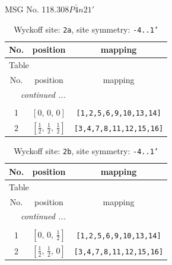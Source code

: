 \documentclass[fleqn,8pt]{jsarticle}
\begin{document}
\setcounter{MaxMatrixCols}{32}

\renewcommand{\tablename}{Table~}
\renewcommand{\figurename}{Figure~}
\begin{center}
\LARGE
MSG No. 118.308\quad$P\bar{4}n21'$
\end{center}
\renewcommand{\arraystretch}{1.2}
\begin{longtable}{ccc}
\caption{Wyckoff site: {\tt 2a}, site symmetry: {\tt -4..1'}}
 \\
 \hline \hline
No. & position & mapping \\ \hline \endfirsthead

\multicolumn{2}{l}{\tablename\ \thetable{}} \\
 \hline \hline
No. & position & mapping \\ \hline \endhead

 \hline \hline
\multicolumn{2}{r}{\footnotesize\it continued ...} \\ \endfoot

 \hline \hline
\multicolumn{2}{r}{} \\ \endlastfoot

1 & $\left[ 0,\, 0,\, 0 \right]$ & {\tt [1,2,5,6,9,10,13,14]} \\ \hline
2 & $\left[ \frac{1}{2},\, \frac{1}{2},\, \frac{1}{2} \right]$ & {\tt [3,4,7,8,11,12,15,16]} \\
\end{longtable}
\renewcommand{\arraystretch}{1.2}
\begin{longtable}{ccc}
\caption{Wyckoff site: {\tt 2b}, site symmetry: {\tt -4..1'}}
 \\
 \hline \hline
No. & position & mapping \\ \hline \endfirsthead

\multicolumn{2}{l}{\tablename\ \thetable{}} \\
 \hline \hline
No. & position & mapping \\ \hline \endhead

 \hline \hline
\multicolumn{2}{r}{\footnotesize\it continued ...} \\ \endfoot

 \hline \hline
\multicolumn{2}{r}{} \\ \endlastfoot

1 & $\left[ 0,\, 0,\, \frac{1}{2} \right]$ & {\tt [1,2,5,6,9,10,13,14]} \\ \hline
2 & $\left[ \frac{1}{2},\, \frac{1}{2},\, 0 \right]$ & {\tt [3,4,7,8,11,12,15,16]} \\
\end{longtable}
\end{document}
